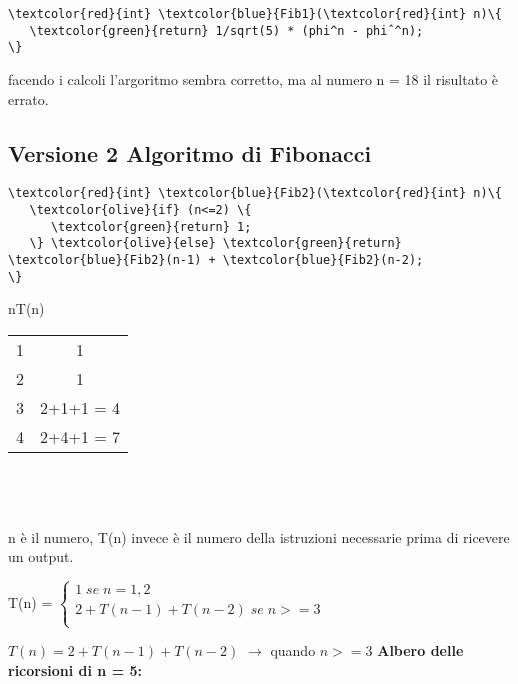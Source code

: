 \documentclass[12pt, letterpaper]{article}
\begin{document}
\begin{Verbatim}[commandchars=\\\{\}]
\textcolor{red}{int} \textcolor{blue}{Fib1}(\textcolor{red}{int} n)\{
   \textcolor{green}{return} 1/sqrt(5) * (phi^n - phiˆ^n);
\}
\end{Verbatim}
facendo i calcoli l'argoritmo sembra corretto, ma al numero n = 18 il risultato è errato.

\subsection{Versione 2 Algoritmo di Fibonacci}

\begin{Verbatim}[commandchars=\\\{\}]
\textcolor{red}{int} \textcolor{blue}{Fib2}(\textcolor{red}{int} n)\{
   \textcolor{olive}{if} (n<=2) \{
      \textcolor{green}{return} 1;
   \} \textcolor{olive}{else} \textcolor{green}{return} \textcolor{blue}{Fib2}(n-1) + \textcolor{blue}{Fib2}(n-2);
\}
\end{Verbatim}
\;\;n\;\;\;\;\;\;\;\;T(n)\\
\begin{tabular}{ |c|c| } 
 \hline
 1 & 1 \\ 
 2 & 1\\ 
 3 & 2+1+1 = 4\\ 
 4 & 2+4+1 = 7\\
 \hline
\end{tabular}
\\
\\
\\n è il numero, T(n) invece è il numero della istruzioni necessarie prima di ricevere un output.
\begin{center}
      T(n) =
   $\left \{
\begin{array}{l}	1 \; se \; n = 1,2\\
	2 + T(n-1) + T(n-2) \; se \;  n >= 3\\
\end{array}
\right.$
\end{center}
\(T(n) = 2+T(n-1)+T(n-2)\) $\rightarrow$ quando \(n >= 3\)
\newpage
\textbf{Albero delle ricorsioni di n = 5:}
\\
\\
\begin{center}
\end{center}
\end{document}
